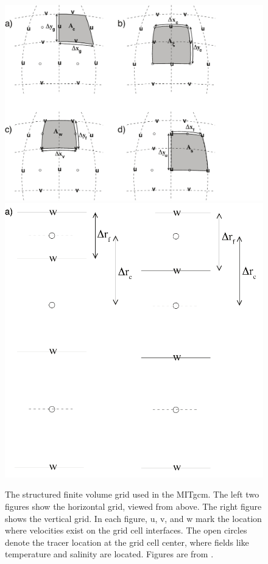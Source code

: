 \begin{figure}
    \centering
    \includegraphics[width=.6\textwidth]{../figures/hgrid-abcd.pdf}
    \includegraphics[width=.2\textwidth]{../figures/vgrid-accur-center.pdf}
    \caption{The structured finite volume grid used in the MITgcm. The
        left two figures show the horizontal grid, viewed from above. The right
        figure shows the vertical grid. In each figure, u, v, and w mark the
        location where velocities exist on the grid cell interfaces. The open
        circles denote the tracer location at the grid cell center,
        where fields like temperature and salinity are located. Figures are from
    \citet{campin_mitgcmmitgcm_2021}.}
    \label{fig:mitgcm_grid}
\end{figure}

